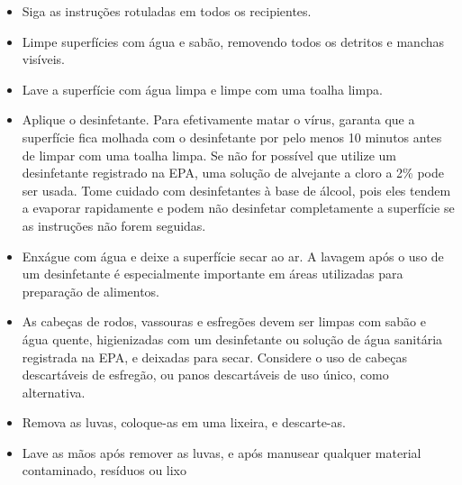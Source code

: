 \documentclass[onecolumn,journal]{IEEEtran}
\begin{document}
\begin{multicols}{2}
\begin{itemize}
    \item Siga as instruções rotuladas em todos os recipientes.
    \item Limpe superfícies com água e sabão, removendo todos os detritos e manchas visíveis.
    \item Lave a superfície com água limpa e limpe com uma toalha limpa.
    \item Aplique o desinfetante. Para efetivamente matar o vírus, garanta que a superfície fica molhada com o desinfetante por pelo menos 10 minutos antes de limpar com uma toalha limpa. Se não for possível que utilize um desinfetante registrado na EPA, uma solução de alvejante a cloro a 2\% pode ser usada. Tome cuidado com desinfetantes à base de álcool, pois eles tendem a evaporar rapidamente e podem não desinfetar completamente a superfície se as instruções não forem seguidas.
    \item Enxágue com água e deixe a superfície secar ao ar. A lavagem após o uso de um desinfetante é especialmente importante em áreas utilizadas para preparação de alimentos.
    \item As cabeças de rodos, vassouras e esfregões devem ser limpas com sabão e água quente, higienizadas com um desinfetante ou solução de água sanitária registrada na EPA, e deixadas para secar. Considere o uso de cabeças descartáveis de esfregão, ou panos descartáveis de uso único, como alternativa.
    \item Remova as luvas, coloque-as em uma lixeira, e descarte-as.
    \item Lave as mãos após remover as luvas, e após manusear qualquer material contaminado, resíduos ou lixo
\end{itemize}

\end{multicols}

% 

\end{document}
